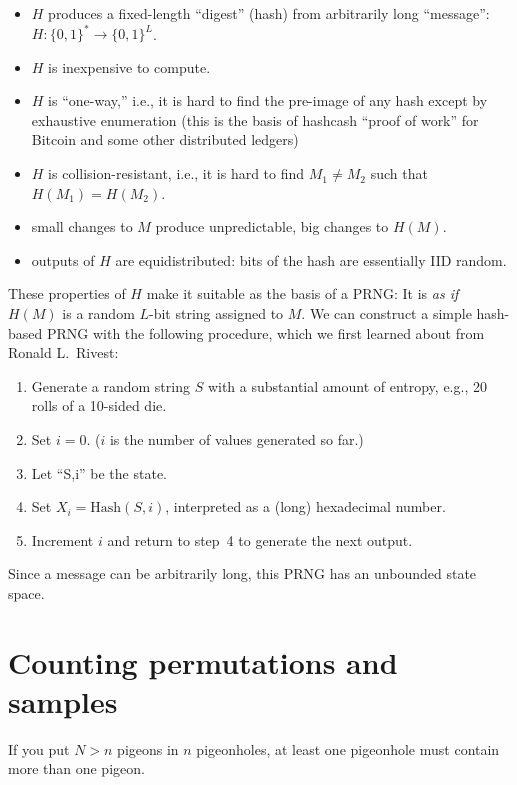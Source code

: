 \documentclass[graybox]{svmult}
\begin{document}
\begin{itemize}
\item $H$ produces a fixed-length ``digest'' (hash) from arbitrarily long ``message'': $H:\{0, 1\}^* \rightarrow \{0, 1\}^L$.
\item $H$ is inexpensive to compute.
\item $H$ is ``one-way,'' i.e., it is hard to find the pre-image of any hash except by exhaustive enumeration (this is the basis of  hashcash ``proof of work'' for Bitcoin and some other distributed ledgers)
\item $H$ is collision-resistant, i.e., it is hard to find $M_1 \ne M_2$ such that $H(M_1) = H(M_2)$.
\item small changes to $M$ produce unpredictable, big changes to $H(M)$.
\item outputs of $H$ are equidistributed: bits of the hash are essentially IID random.
\end{itemize}

These properties of $H$ make it suitable as the basis of a PRNG:
It is \emph{as if} $H(M)$ is a random $L$-bit string assigned to $M$.
We can construct a simple hash-based PRNG with the following procedure, which we first learned about
from Ronald L.~Rivest:

\begin{enumerate}
\item Generate a random string $S$ with a substantial amount of entropy, e.g., 20 rolls of a
10-sided die.
\item Set $i=0$. ($i$ is the number of values generated so far.)
\item Let ``S,i'' be the state.
\item Set $X_i = {\mbox{Hash}}(S,i)$, interpreted as a (long) hexadecimal number.
\item Increment $i$ and return to step~4 to generate the next output.
\end{enumerate}

\noindent Since a message can be arbitrarily long, this PRNG has an unbounded state space.

\section{Counting permutations and samples}
\label{sec:count}

\begin{theorem}
If you put $N>n$ pigeons in $n$ pigeonholes, at least one
pigeonhole must contain more than one pigeon.
\end{theorem}
\end{document}
